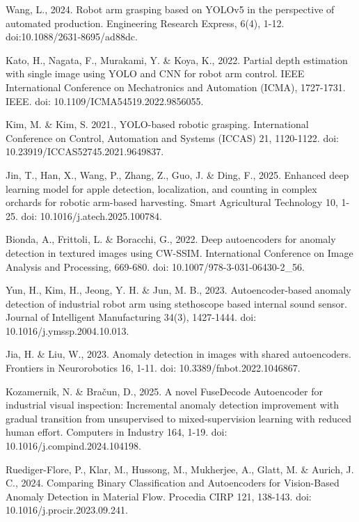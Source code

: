 \begin{thebibliography}{9}
  Wang, L., 2024. Robot arm grasping based on YOLOv5 in the
  perspective of automated production. Engineering Research Express,
  6(4), 1-12. doi:10.1088/2631-8695/ad88dc.

  Kato, H., Nagata, F., Murakami, Y. \& Koya, K., 2022. Partial depth
  estimation with single image using YOLO and CNN for robot arm
  control. IEEE International Conference on Mechatronics and
  Automation (ICMA), 1727-1731. IEEE. doi: 10.1109/ICMA54519.2022.9856055.

  Kim, M. \& Kim, S. 2021., YOLO-based robotic grasping. International
  Conference on Control, Automation and
  Systems (ICCAS) 21, 1120-1122. doi: 10.23919/ICCAS52745.2021.9649837.

  Jin, T., Han, X., Wang, P., Zhang, Z., Guo, J. \& Ding, F., 2025.
  Enhanced deep learning model for apple detection, localization, and
  counting in complex orchards for robotic arm-based harvesting.
  Smart Agricultural Technology 10, 1-25. doi: 10.1016/j.atech.2025.100784.

  Bionda, A., Frittoli, L. \& Boracchi, G., 2022. Deep
  autoencoders for anomaly detection in textured images using
  CW-SSIM. International Conference on Image Analysis and
  Processing, 669-680. doi: 10.1007/978-3-031-06430-2\_56.

  Yun, H., Kim, H., Jeong, Y. H. \& Jun, M. B., 2023.
  Autoencoder-based anomaly detection of industrial robot arm using
  stethoscope based internal sound sensor. Journal of Intelligent
  Manufacturing 34(3), 1427-1444. doi: 10.1016/j.ymssp.2004.10.013.

  Jia, H. \& Liu, W., 2023. Anomaly detection in images with shared
  autoencoders. Frontiers in Neurorobotics 16, 1-11. doi:
  10.3389/fnbot.2022.1046867.

  Kozamernik, N. \& Bračun, D., 2025. A novel FuseDecode Autoencoder
  for industrial visual inspection: Incremental anomaly detection
  improvement with gradual transition from unsupervised to
  mixed-supervision learning with reduced human effort. Computers in
  Industry 164, 1-19. doi: 10.1016/j.compind.2024.104198.

  Ruediger-Flore, P., Klar, M., Hussong, M., Mukherjee, A., Glatt,
  M. \& Aurich, J. C., 2024. Comparing Binary Classification and
  Autoencoders for Vision-Based Anomaly Detection in Material Flow.
  Procedia CIRP 121, 138-143. doi: 10.1016/j.procir.2023.09.241.


\end{thebibliography}
